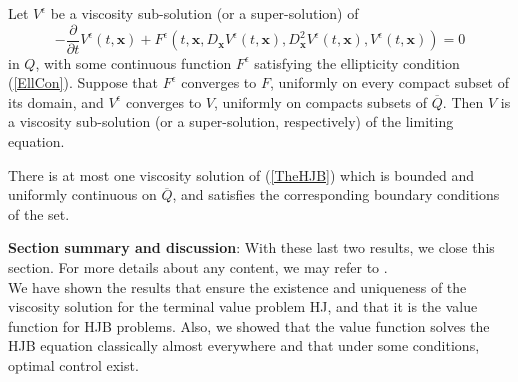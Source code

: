 \begin{lemma}
Let $V^{\epsilon}$ be a viscosity sub-solution (or a super-solution) of
\begin{equation}
-\frac{\partial}{\partial t}V^{\epsilon}(t,\bm{x})+F^{\epsilon}(t,\bm{x},D_{\bm{x}}V^{\epsilon}(t,\bm{x}),D^2_{\bm{x}}V^{\epsilon}(t,\bm{x}),V^{\epsilon}(t,\bm{x}))=0
\end{equation}
in $Q$, with some continuous function $F^{\epsilon}$ satisfying the ellipticity condition (\ref{EllCon}). Suppose that $F^{\epsilon}$ converges to $F$, uniformly on every compact subset of its domain, and $V^{\epsilon}$ converges to $V$, uniformly on compacts subsets of $\overline{Q}$. Then $V$ is a viscosity sub-solution (or a super-solution, respectively) of the limiting equation.
\end{lemma}
\begin{corollary}
There is at most one viscosity solution of (\ref{TheHJB}) which is bounded and uniformly continuous on $\overline{Q}$, and satisfies the corresponding boundary conditions of the set.
\end{corollary}

\textbf{Section summary and discussion}: With these last two results, we close this section. For more details about any content, we may refer to \cite{fleming2006controlled}.\\
We have shown the results that ensure the existence and uniqueness of the viscosity solution for the terminal value problem HJ, and that it is the value function for HJB problems. Also, we showed that the value function solves the HJB equation classically almost everywhere and that under some conditions, optimal control exist.